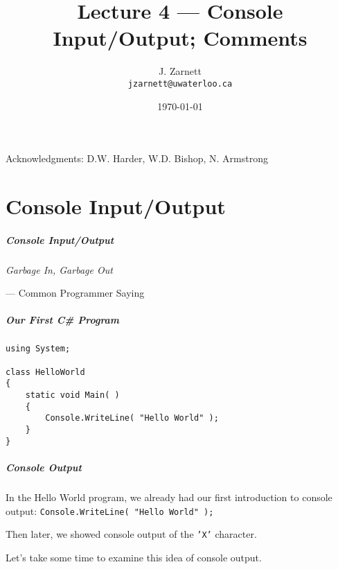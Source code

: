

\title{Lecture 4 --- Console Input/Output; Comments}

\author{J. Zarnett\\
\texttt{jzarnett@uwaterloo.ca}}
\date{\today}



\begin{frame}
  \titlepage
  
  \begin{center}
  \small{Acknowledgments: D.W. Harder, W.D. Bishop, N. Armstrong}
  \end{center}
 \end{frame}
 

\part{Console Input/Output}
\begin{frame}\partpage\end{frame}

\begin{frame}
\frametitle{Console Input/Output}

\vspace{-5em}
\begin{center}
	\textit{Garbage In, Garbage Out}
\end{center}
\vspace{-5em}
\hfill --- Common Programmer Saying

\end{frame}

\begin{frame}[fragile]
\frametitle{Our First C\# Program}

\begin{verbatim}
using System;

class HelloWorld
{
    static void Main( )
    {
        Console.WriteLine( "Hello World" );
    }
}
\end{verbatim}

\end{frame}

\begin{frame}
\frametitle{Console Output}
In the Hello World program, we already had our first introduction to console output: \texttt{Console.WriteLine( "Hello World" );}

Then later, we showed console output of the \texttt{'X'} character.

Let's take some time to examine this idea of console output.

\end{frame}

